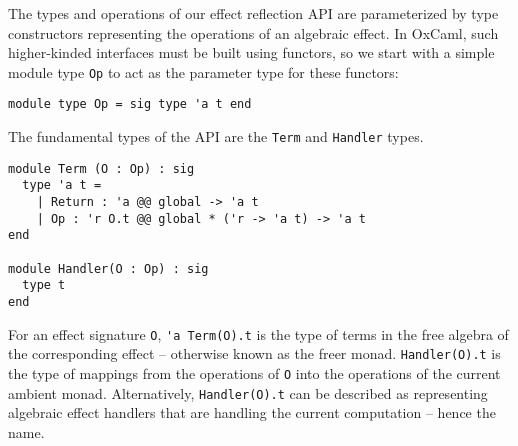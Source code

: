 \documentclass[acmsmall, screen, nonacm]{acmart}
\theoremstyle{definition}
\begin{document}
The types and operations of our effect reflection API are parameterized
by type constructors representing the operations of an algebraic
effect. In OxCaml, such higher-kinded interfaces must be built using
functors, so we start with a simple module type
\lstinline[style=oxcaml]{Op} to act as the parameter type for these
functors:
\begin{lstlisting}[style=oxcaml]
module type Op = sig type 'a t end
\end{lstlisting}
The fundamental types of the API are the \lstinline[style=oxcaml]{Term}
and \lstinline[style=oxcaml]{Handler} types.
\begin{lstlisting}[style=oxcaml]
module Term (O : Op) : sig
  type 'a t =
    | Return : 'a @@ global -> 'a t
    | Op : 'r O.t @@ global * ('r -> 'a t) -> 'a t
end

module Handler(O : Op) : sig
  type t
end
\end{lstlisting}
For an effect signature \lstinline[style=oxcaml]{O},
\lstinline[style=oxcaml]{'a Term(O).t} is the type of terms in the free
algebra of the corresponding effect -- otherwise known as the freer
monad\cite{kiselyov2015freer}. \lstinline[style=oxcaml]{Handler(O).t} is
the type of mappings from the operations of \lstinline[style=oxcaml]{O}
into the operations of the current ambient monad. Alternatively,
\lstinline[style=oxcaml]{Handler(O).t} can be described as representing
algebraic effect handlers that are handling the current computation --
hence the name.
\end{document}
